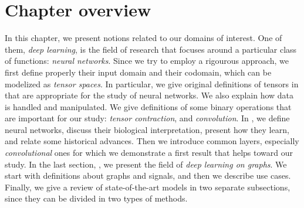 \section*{Chapter overview}

In this chapter, we present notions related to our domains of interest. One of them, \emph{deep learning}, is the field of research that focuses around a particular class of functions: \emph{neural networks}. Since we try to employ a rigourous approach, we first define properly their input domain and their codomain, which can be modelized as \emph{tensor spaces}. In particular, we give original definitions of tensors in  that are appropriate for the study of neural networks. We also explain how data is handled and manipulated. We give definitions of some binary operations that are important for our study: \emph{tensor contraction}, and \emph{convolution}. In , we define neural networks, discuss their biological interpretation, present how they learn, and relate some historical advances. Then we introduce common layers, especially \emph{convolutional} ones for which we demonstrate a first result that helps toward our study. In the last section, , we present the field of \emph{deep learning on graphs}. We start with definitions about graphs and signals, and then we describe use cases. Finally, we give a review of state-of-the-art models in two separate subsections, since they can be divided in two types of methods.